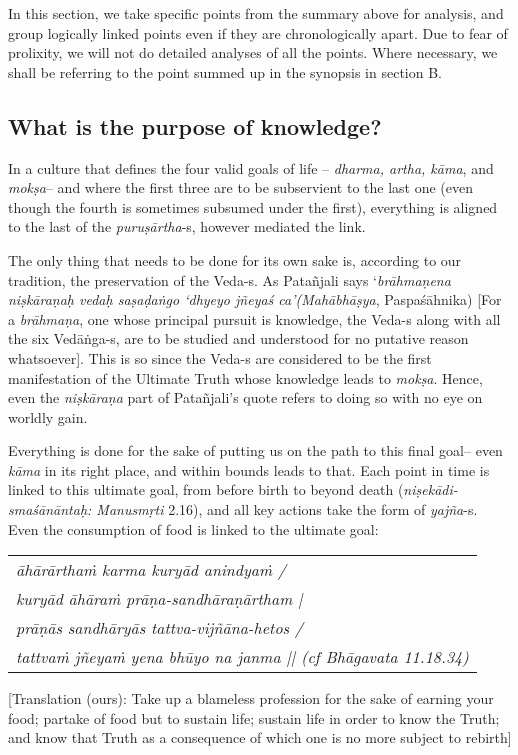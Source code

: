 In this section, we take specific points from the summary above for analysis, and group logically linked points even if they are chronologically apart. Due to fear of prolixity, we will not do detailed analyses of all the points. Where necessary, we shall be referring to the point summed up in the synopsis in section B.
\vskip -40pt

\subsection{What is the purpose of knowledge?}
\vskip -5pt

In a culture that defines the four valid goals of life – {\sl dharma, artha, kāma}, and {\sl mokṣa}– and where the first three are to be subservient to the last one (even though the fourth is sometimes subsumed under the first), everything is aligned to the last of the {\sl puruṣārtha}-s, however mediated the link. 

The only thing that needs to be done for its own sake is, according to our tradition, the preservation of the Veda-s. As Patañjali says ‘{\sl brāhmaṇena niṣkāraṇaḥ vedaḥ saṣaḍaṅgo ‘dhyeyo jñeyaś ca’(Mahābhāṣya}, Paspaśāhnika) [For a {\sl brāhmaṇa}, one whose principal pursuit is knowledge, the Veda-s along with all the six Vedāṅga-s, are to be studied and understood for no putative reason whatsoever]. This is so since the Veda-s are considered to be the first manifestation of the Ultimate Truth whose knowledge leads to {\sl mokṣa}. Hence, even the {\sl niṣkāraṇa} part of Patañjali’s quote refers to doing so with no eye on worldly gain.

Everything is done for the sake of putting us on the path to this final goal– even {\sl kāma} in its right place, and within bounds leads to that. Each point in time is linked to this ultimate goal, from before birth to beyond death ({\sl niṣekādi-smaśānāntaḥ: Manusmṛti} 2.16), and all key actions take the form of {\sl yajña}-s. Even the consumption of food is linked to the ultimate goal:  
\begin{center}
\begin{tabular}{>{\sl}l}
āhārārthaṁ karma kuryād anindyaṁ / \\
kuryād āhāraṁ prāṇa-sandhāraṇārtham | \\
prāṇās sandhāryās tattva-vijñāna-hetos / \\
tattvaṁ jñeyaṁ yena bhūyo na janma || (cf Bhāgavata\index{Bhāgavata} {\rm 11.18.34}) 
\end{tabular}
\end{center}
[Translation (ours): Take up a blameless profession  for the sake of earning your food; partake of food but to sustain life; sustain life in order to know the Truth; and know that Truth as a consequence of which one is no more subject to rebirth]

